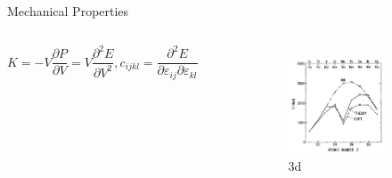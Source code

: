 \documentclass[aspectratio=169]{beamer}
\begin{document}
    \begin{frame}{Mechanical Properties}
        \begin{columns}
            \begin{equation*}
                K = -V\frac{\partial P}{\partial V} = V \frac{\partial^2 E}{\partial V^2}, c_{ijkl} = \frac{\partial^2 E}{\partial \varepsilon_{ij}\partial \varepsilon_{kl}}
            \end{equation*}
            \begin{figure}
                \centering
                \begin{subfigure}{0.45\textwidth}
                    \centering
                    \includegraphics[width=\linewidth]{lectures/figures/8_3D_TM_Bulk_Moduli.png}
                    \caption{3d}
                \end{subfigure}
                \begin{subfigure}{0.45\textwidth}
                    \centering

\end{subfigure}
\end{figure}
\end{columns}
\end{frame}
\end{document}
